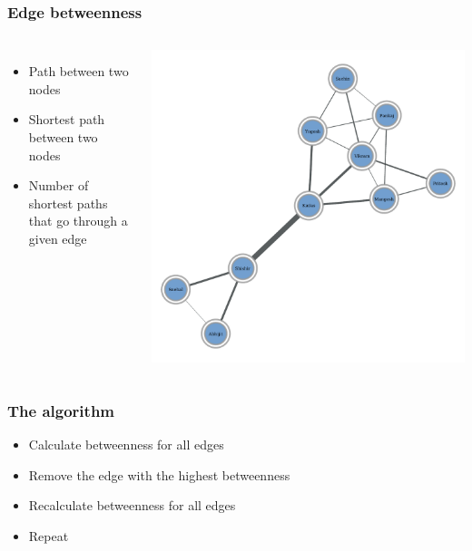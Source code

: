 \documentclass{beamer}
\begin{document}
\begin{frame}
    \frametitle{Edge betweenness}
    \begin{columns}
    \centering
        \begin{itemize}
        \setlength\itemsep{1em}
            \item{Path between two nodes}
            \item{Shortest path between two nodes}
            \item{Number of shortest paths that go through a given edge}
        \end{itemize}
    \includegraphics[width=0.9\columnwidth,trim=0 0 0 0]{gn0.pdf}
    \end{columns}

\end{frame}
\begin{frame}
    \frametitle{The algorithm}
    \centering

    \begin{itemize}
    \setlength\itemsep{1em}
        \item{Calculate betweenness for all edges}
        \item{Remove the edge with the highest betweenness}
        \item{Recalculate betweenness for all edges}
        \item{Repeat}
    \end{itemize}
\end{frame}
\end{document}
